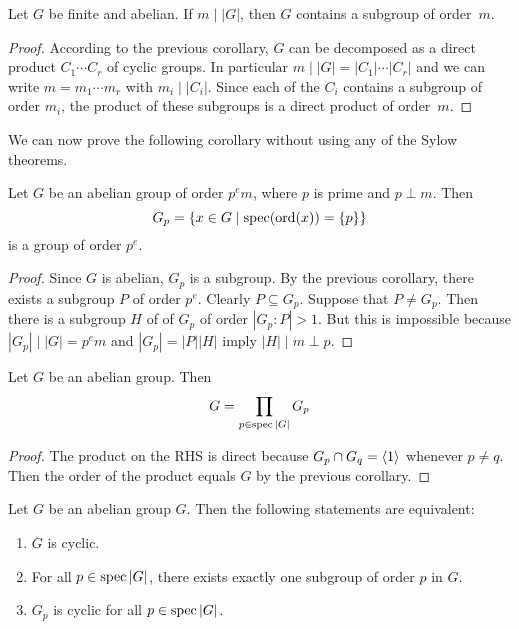 \begin{cor}\label{subgroup-of-compatible-order}
    Let $G$ be finite and abelian. If $m\mid|G|$, then $G$ contains a subgroup of order~$m$.
\end{cor}

\begin{proof} According to the previous corollary, $G$ can be decomposed as a direct product $C_1\cdots C_r$ of cyclic groups. In particular $m\mid|G|=|C_1|\cdots|C_r|$ and we can write $m=m_1\cdots m_r$ with $m_i\mid|C_i|$. Since each of the $C_i$ contains a subgroup of order $m_i$, the product of these subgroups is a direct product of order~$m$.  \end{proof}

We can now prove the following corollary without using any of the Sylow theorems.

\begin{cor}
    Let $G$ be an abelian group of order $p^em$, where $p$ is prime and $p\perp m$. Then
    $$
        G_p =\{x\in G\mid\operatorname{spec}({\rm ord}(x))=\{p\}\}
    $$
    is a group of order $p^e$.
\end{cor}

\begin{proof} Since $G$ is abelian, $G_p$ is a subgroup. By the previous corollary, there exists a subgroup $P$ of order $p^e$. Clearly $P\subseteq G_p$. Suppose that $P\ne G_p$. Then there is a subgroup $H$ of of $G_p$ of order $|G_p:P|>1$. But this is impossible because $|G_p|\mid|G|=p^em$ and $|G_p|=|P||H|$ imply $|H|\mid m\perp p$.  \end{proof}

\begin{cor}\label{product-of-all-Gp}
    Let\/ $G$ be an abelian group. Then
$$
    G = \prod_{p \in \operatorname{spec}|G|} G_p
$$
\end{cor}

\begin{proof} The product on the RHS is direct because $G_p\cap G_q=\langle1\rangle$ whenever $p\ne q$. Then the order of the product equals $G$ by the previous corollary.  \end{proof}

\begin{thm}
    Let\/ $G$ be an abelian group\/ $G$. Then the following statements are equivalent:
    \begin{enumerate}[\rm a)]
      \item $G$ is cyclic.
      \item For all\/ $p \in \operatorname{spec}|G|$, there exists exactly one subgroup of order\/ $p$ in\/ $G$.
      \item $G_p$ is cyclic for all\/ $p \in \operatorname{spec}|G|$.
    \end{enumerate}
\end{thm}

